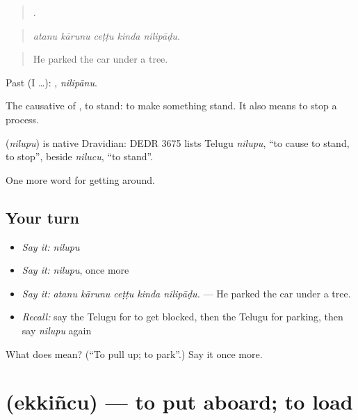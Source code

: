 \begin{quote}
    .
\end{quote}

\begin{quote}
\emph{atanu kārunu ceṭṭu kinda nilipāḍu.}
\end{quote}

\begin{quote}
He parked the car under a tree.
\end{quote}

Past (I …): , \emph{nilipānu}.

The causative of , to stand: to make something stand. It also means to stop a process.

\begin{cousinweb}
\textbf{} (\emph{nilupu}) is native Dravidian: DEDR 3675 lists Telugu \emph{nilupu}, \textquotedblleft{}to cause to stand, to stop\textquotedblright{}, beside \emph{nilucu}, \textquotedblleft{}to stand\textquotedblright{}.
\end{cousinweb}

\begin{grammarlens}[title={What you've built}]
One more word for getting around.
\end{grammarlens}

\subsection*{Your turn}
\begin{itemize}
\raggedright
  \item \emph{Say it:} \emph{nilupu}
  \item \emph{Say it:} \emph{nilupu}, once more
  \item \emph{Say it:} \emph{atanu kārunu ceṭṭu kinda nilipāḍu.} — He parked the car under a tree.
  \item \emph{Recall:} say the Telugu for to get blocked, then the Telugu for parking, then say \emph{nilupu} again
\end{itemize}

\begin{tcolorbox}[breakable,colback=teal!4,colframe=teal!35!black,title={Before you move on}]
What does  mean? (\textquotedblleft{}To pull up; to park\textquotedblright{}.) Say it once more.
\end{tcolorbox}
\section[\texorpdfstring{\te{ఎక్కించు} (ekkiñcu)}{ఎక్కించు (ekkiñcu)}]{ (ekkiñcu) — to put aboard; to load}

